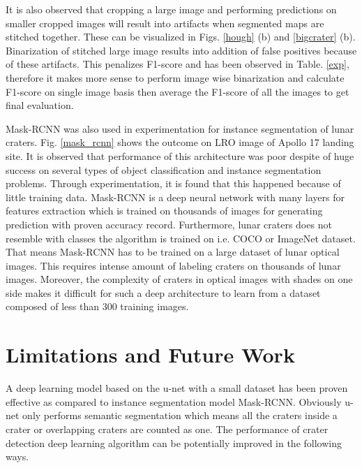 \documentclass[11pt]{article}
\begin{document}
It is also observed that cropping a large image and performing predictions on smaller cropped images will result into artifacts when segmented maps are stitched together. These can be visualized in Figs. \ref{hough} (b) and \ref{bigcrater} (b). Binarization of stitched large image results into addition of false positives because of these artifacts. This penalizes F1-score and has been observed in Table. \ref{exp}, therefore it makes more sense to perform image wise binarization and calculate F1-score on single image basis then average the F1-score of all the images to get final evaluation.

Mask-RCNN was also used in experimentation for instance segmentation of lunar craters. Fig. \ref{mask_rcnn} shows the outcome on LRO image of Apollo 17 landing site. It is observed that performance of this architecture was poor despite of huge success on several types of object classification and instance segmentation problems. Through experimentation, it is found that this happened because of little training data. Mask-RCNN is a deep neural network with many layers for features extraction which is trained on thousands of images for generating prediction with proven accuracy record. Furthermore, lunar craters does not resemble with classes the algorithm is trained on i.e. COCO or ImageNet dataset. That means Mask-RCNN has to be trained on a large dataset of lunar optical images. This requires intense amount of labeling craters on thousands of lunar images. Moreover, the complexity of craters in optical images with shades on one side makes it difficult for such a deep architecture to learn from a dataset composed of less than 300 training images.

\newpage
\section{Limitations and Future Work}
A deep learning model based on the u-net with a small dataset has been proven effective as compared to instance segmentation model Mask-RCNN. Obviously u-net only performs semantic segmentation which means all the craters inside a crater or overlapping craters are counted as one. The performance of crater detection deep learning algorithm can be potentially improved in the following ways.
\end{document}
